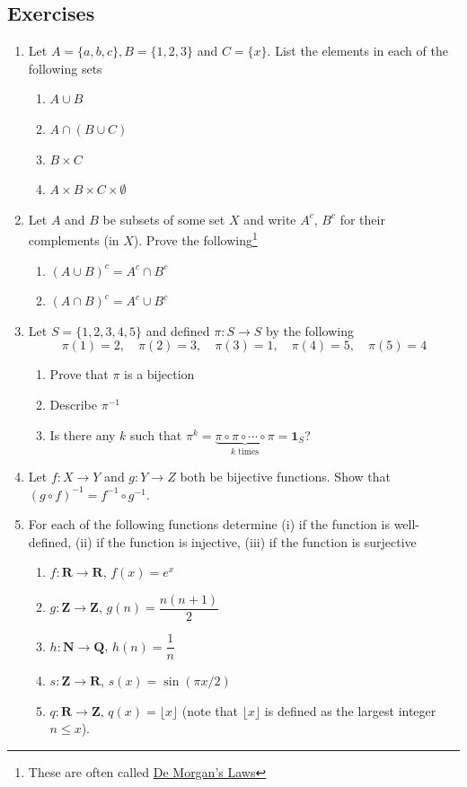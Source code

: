 \documentclass[12pt]{article}
\numberwithin{equation}{subsection}
\theoremstyle{note}
\begin{document}
\subsection{Exercises}
\begin{enumerate}[label=\arabic*.]
	\item Let $A=\{a,b,c\}, B=\{1,2,3\}$ and $C=\{x\}$. List the elements in each of the following sets 
	\begin{enumerate}
		\item $A\cup B$
		\item $A \cap (B\cup C)$
		\item $B\times C$
		\item $A\times B\times C\times \emptyset$
	\end{enumerate}
	
		\item Let $A$ and $B$ be subsets of some set $X$ and write $A^{c}$, $B^{c}$ for their complements (in $X$). Prove the following\footnote{These are often called \href{https://en.wikipedia.org/wiki/De_Morgan\%27s_laws}{De Morgan's Laws}}
	\begin{enumerate}
		\item $(A\cup B)^{c}=A^c\cap B^c$
		\item $(A\cap B)^c=A^c \cup B^c$
	\end{enumerate}
		
	\item Let $S=\{1,2,3,4,5\}$ and defined $\pi\colon S\to S$ by the following \[ \pi(1)=2, \quad \pi(2)=3, \quad \pi(3)=1, \quad \pi(4)=5, \quad \pi(5)=4\]
	\begin{enumerate}
		\item Prove that $\pi$ is a bijection
		\item Describe $\pi^{-1}$
		\item Is there any $k$ such that $\pi^k=\underbrace{\pi\circ\pi\circ \cdots \circ \pi}_{\text{$k$ times}}=\mathbf{1}_S$?
	\end{enumerate}
	
	\item Let $f\colon X\to Y$ and $g\colon Y\to Z$ both be bijective functions. Show that $(g\circ f)^{-1}=f^{-1}\circ g^{-1}$. 
	
	\item For each of the following functions determine (i) if the function is well-defined, (ii) if the function is injective, (iii) if the function is surjective~\begin{enumerate}
		\item $f\colon \mathbf{R}\to \mathbf{R}$, $f(x)=e^x$
		\item $g\colon \mathbf{Z}\to\mathbf{Z}$, $g(n)=\dfrac{n(n+1)}{2}$
		\item $h\colon \mathbf{N}\to\mathbf{Q}$, $h(n)=\dfrac{1}{n}$
		\item $s\colon \mathbf{Z}\to \mathbf{R}$, $s(x)=\sin(\pi x/2)$
		\item $q\colon \mathbf{R}\to\mathbf{Z}$, $q(x)=\lfloor x\rfloor$ \quad (note that $\lfloor x\rfloor$ is defined as the largest integer $n\leq x$).
	\end{enumerate}
	

\end{enumerate}
\end{document}
